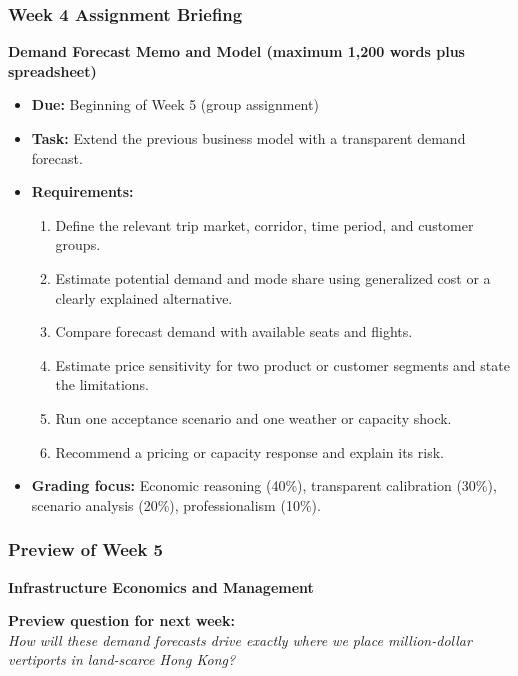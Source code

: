 \documentclass{beamer}
\begin{document}
\begin{frame}[t]
\frametitle{Week 4 Assignment Briefing}
\textbf{Demand Forecast Memo and Model (maximum 1,200 words plus spreadsheet)}
\begin{itemize}
\item \textbf{Due:} Beginning of Week 5 (group assignment)
\item \textbf{Task:} Extend the previous business model with a transparent demand forecast.
\item \textbf{Requirements:}
\begin{enumerate}
\item Define the relevant trip market, corridor, time period, and customer groups.
\item Estimate potential demand and mode share using generalized cost or a clearly explained alternative.
\item Compare forecast demand with available seats and flights.
\item Estimate price sensitivity for two product or customer segments and state the limitations.
\item Run one acceptance scenario and one weather or capacity shock.
\item Recommend a pricing or capacity response and explain its risk.
\end{enumerate}
\item \textbf{Grading focus:} Economic reasoning (40\%), transparent calibration (30\%), scenario analysis (20\%), professionalism (10\%).
\end{itemize}
\end{frame}

\begin{frame}[t]
  \frametitle{Preview of Week 5}
  
  \begin{center}
      \Large \textbf{Infrastructure Economics and Management}
  \end{center}
  
  \vspace{1cm}
  \textbf{Preview question for next week:} \\
  \textit{How will these demand forecasts drive exactly where we place million-dollar vertiports in land-scarce Hong Kong?}
\end{frame}
\end{document}
